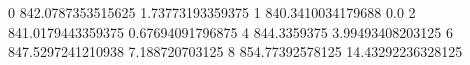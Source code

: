 0 842.0787353515625 1.73773193359375
1 840.3410034179688 0.0
2 841.0179443359375 0.67694091796875
4 844.3359375 3.99493408203125
6 847.5297241210938 7.188720703125
8 854.77392578125 14.43292236328125
